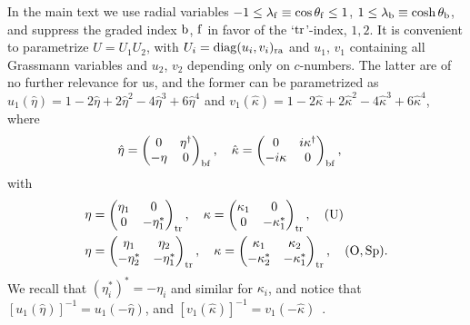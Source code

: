 \documentclass[twocolumn,showpacs,aps,prl]{revtex4}
\begin{document}
In the main text we use radial variables 
$-1\leq \lambda_{\rm f}\equiv \cos\theta_{\rm f}\leq 1$, 
$1\leq \lambda_{\rm b}\equiv \cosh\theta_{\rm b}$, and suppress 
the graded index ${\rm b}$, ${\rm f}$ in favor of the `${\rm tr}$'-index, $1,2$.
It is convenient to parametrize 
$U=U_1U_2$,
with 
$U_i
={\rm diag}(u_i,  v_i)_{\rm ra}$ and 
$u_1$, $v_1$ containing all Grassmann variables and 
$u_2$, $v_2$ depending only on $c$-numbers. 
The latter are of no further 
relevance for us, and the former can be parametrized as  
$u_1(\hat{\eta})
= 1 - 2\hat{\eta}+ 2\hat{\eta}^2 - 4\hat{\eta}^3+ 6 \hat{\eta}^4$
and 
$v_1(\hat{\kappa})
= 1 - 2\hat{\kappa}+ 2\hat{\kappa}^2 - 4\hat{\kappa}^3+ 6 \hat{\kappa}^4$, 
where 
\begin{align}
\hat{\eta}&=
\begin{pmatrix}
0 & \eta^\dagger \\
-\eta & 0
\end{pmatrix}_{\rm bf},
\quad 
\hat{\kappa}
=
\begin{pmatrix}
0 & i\kappa^\dagger \\
-i\kappa & 0
\end{pmatrix}_{\rm bf},
\end{align}
with
\begin{align}
\eta
&=
\begin{pmatrix}
\eta_1 & 0\\
0 & -\eta_1^*
\end{pmatrix}_{\rm tr},
\quad
\kappa
=
\begin{pmatrix}
\kappa_1 & 0\\
0 & -\kappa_1^*
\end{pmatrix}_{\rm tr},
\quad ({\rm U})
\\
\eta
&=
\begin{pmatrix}
\eta_1 & \eta_2\\
-\eta_2^* & -\eta_1^*
\end{pmatrix}_{\rm tr},
\quad
\kappa
=
\begin{pmatrix}
\kappa_1 & \kappa_2 \\
-\kappa_2^* & -\kappa_1^*
\end{pmatrix}_{\rm tr},
\quad ({\rm O, Sp}).
\end{align}
We recall that
$(\eta_i^*)^*=-\eta_i$ and similar for $\kappa_i$, 
and notice that
$[u_1(\hat{\eta})]^{-1}=u_1(-\hat{\eta})$, 
and 
$[v_1(\hat{\kappa})]^{-1}=v_1(-\hat{\kappa})$~\cite{SMEfetovBook}.
\end{document}
